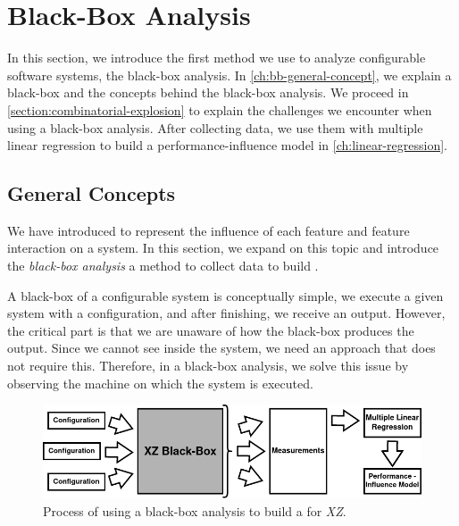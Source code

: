 \section{Black-Box Analysis}\label{ch:Blackbox}
In this section, we introduce the first method we use to analyze configurable software systems, the black-box analysis. 
In \autoref{ch:bb-general-concept}, we explain a black-box and the concepts behind the black-box analysis. 
We proceed in \autoref{section:combinatorial-explosion} to explain the challenges we encounter when using a black-box analysis.
After collecting data, we use them with multiple linear regression to build a performance-influence model in \autoref{ch:linear-regression}.

\subsection{General Concepts}\label{ch:bb-general-concept}

We have introduced {\perfInfluenceModel} to represent the influence of each feature and feature interaction on a system. In this section, 
we expand on this topic and introduce the \emph{black-box analysis} a method to collect data to build \perfInfluenceModel.

A black-box of a configurable system is conceptually simple, we execute a given system with a configuration, and after finishing, we receive an output. 
However, the critical part is that we are unaware of how the black-box produces the output. 
Since we cannot see inside the system, we need an approach that does not require this. 
Therefore, in a black-box analysis, we solve this issue by observing the machine on which the system is executed.

\begin{figure}[h]
    \centering
    \includegraphics[scale=0.53]{gfx/BlackBox2_0.png}
    \caption{Process of using a black-box analysis to build a \perfInfluenceModel for \textit{XZ}.}
    \label{fig:BBxz}
\end{figure}

